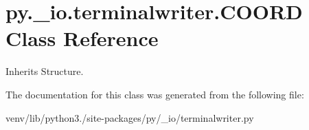 \hypertarget{classpy_1_1__io_1_1terminalwriter_1_1_c_o_o_r_d}{}\section{py.\+\_\+io.\+terminalwriter.\+C\+O\+O\+RD Class Reference}
\label{classpy_1_1__io_1_1terminalwriter_1_1_c_o_o_r_d}


Inherits Structure.



The documentation for this class was generated from the following file\+:\begin{DoxyCompactItemize}
\item 
venv/lib/python3./site-\/packages/py/\+\_\+io/terminalwriter.\+py\end{DoxyCompactItemize}
